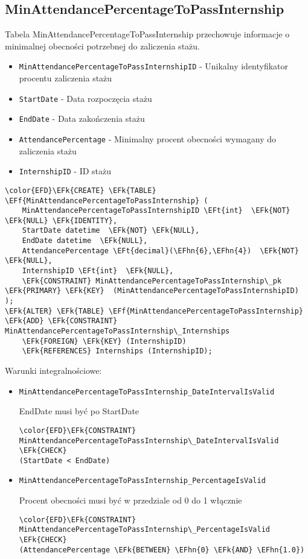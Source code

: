 \documentclass[11pt]{article}
\newcommand{\EFk}[1]{\textcolor{EFk}{\textbf{#1}}} %
\newcommand{\EFf}[1]{\textcolor{EFf}{#1}} %
\newcommand{\EFt}[1]{\textcolor{EFt}{\textbf{#1}}} %
\newcommand{\EFhn}[1]{\textcolor{EFhn}{#1}} %
\begin{document}
\subsection{MinAttendancePercentageToPassInternship}
\label{sec:orgd917084}
Tabela MinAttendancePercentageToPassInternship przechowuje informacje o minimalnej obecności potrzebnej do zaliczenia stażu.
\begin{itemize}
\item \texttt{MinAttendancePercentageToPassInternshipID} - Unikalny identyfikator procentu zaliczenia stażu
\item \texttt{StartDate} - Data rozpoczęcia stażu
\item \texttt{EndDate} - Data zakończenia stażu
\item \texttt{AttendancePercentage} - Minimalny procent obecności wymagany do zaliczenia stażu
\item \texttt{InternshipID} - ID stażu
\end{itemize}
\begin{Code}
\begin{Verbatim}
\color{EFD}\EFk{CREATE} \EFk{TABLE} \EFf{MinAttendancePercentageToPassInternship} (
    MinAttendancePercentageToPassInternshipID \EFt{int}  \EFk{NOT} \EFk{NULL} \EFk{IDENTITY},
    StartDate datetime  \EFk{NOT} \EFk{NULL},
    EndDate datetime  \EFk{NULL},
    AttendancePercentage \EFt{decimal}(\EFhn{6},\EFhn{4})  \EFk{NOT} \EFk{NULL},
    InternshipID \EFt{int}  \EFk{NULL},
    \EFk{CONSTRAINT} MinAttendancePercentageToPassInternship\_pk \EFk{PRIMARY} \EFk{KEY}  (MinAttendancePercentageToPassInternshipID)
);
\EFk{ALTER} \EFk{TABLE} \EFf{MinAttendancePercentageToPassInternship} \EFk{ADD} \EFk{CONSTRAINT} MinAttendancePercentageToPassInternship\_Internships
    \EFk{FOREIGN} \EFk{KEY} (InternshipID)
    \EFk{REFERENCES} Internships (InternshipID);
\end{Verbatim}
\end{Code}
Warunki integralnościowe:


\begin{itemize}
\item \texttt{MinAttendancePercentageToPassInternship\_DateIntervalIsValid}

EndDate musi być po StartDate
\begin{Code}
\begin{Verbatim}
\color{EFD}\EFk{CONSTRAINT} MinAttendancePercentageToPassInternship\_DateIntervalIsValid \EFk{CHECK}
(StartDate < EndDate)
\end{Verbatim}
\end{Code}
\item \texttt{MinAttendancePercentageToPassInternship\_PercentageIsValid}

Procent obecności musi być w przedziale od 0 do 1 włącznie
\begin{Code}
\begin{Verbatim}
\color{EFD}\EFk{CONSTRAINT} MinAttendancePercentageToPassInternship\_PercentageIsValid \EFk{CHECK}
(AttendancePercentage \EFk{BETWEEN} \EFhn{0} \EFk{AND} \EFhn{1.0})
\end{Verbatim}
\end{Code}
\end{itemize}
\end{document}
